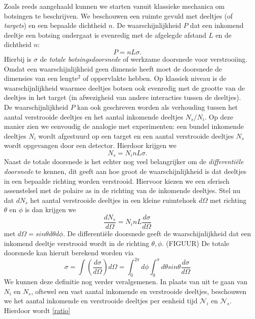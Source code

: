 \documentclass[11pt]{article}
\numberwithin{equation}{section}
\begin{document}
Zoals reeds aangehaald kunnen we starten vanuit klassieke mechanica om botsingen te beschrijven. We beschouwen een ruimte gevuld met deeltjes (of \emph{targets}) en een bepaalde dichtheid $n$. De waarschijnlijkheid $P$ dat een inkomend deeltje een botsing ondergaat is evenredig met de afgelegde afstand $L$ en de dichtheid $n$:
\begin{equation}
	P = nL\sigma.
\end{equation}
Hierbij is $\sigma$ de \emph{totale botsingsdoorsnede} of werkzame doorsnede voor verstrooiing. Omdat een waarschijnlijkheid geen dimensie heeft moet de doorsnede de dimensies van een lengte$^2$ of oppervlakte hebben. Op klassiek niveau is de waarschijnlijkheid waarmee deeltjes botsen ook evenredig met de grootte van de deeltjes in het target (in afwezigheid van andere interacties tussen de deeltjes). De waarschijnlijkheid $P$ kan ook geschreven worden als verhouding tussen het aantal verstrooide deeltjes en het aantal inkomende deeltjes $N_s / N_i$. Op deze manier zien we eenvoudig de analogie met experimenten: een bundel inkomende deeltjes $N_i$ wordt afgestuurd op een target en een aantal verstrooide deeltjes $N_s$ wordt opgevangen door een detector. Hierdoor krijgen we
\begin{equation}\label{ratio}
	N_s = N_inL\sigma.
\end{equation}
Naast de totale doorsnede is het echter nog veel belangrijker om de \emph{differenti\"ele doorsnede} te kennen, dit geeft aan hoe groot de waarschijnlijkheid is dat deeltjes in een bepaalde richting worden verstrooid. Hiervoor kiezen we een sferisch assenstelsel met de polaire as in de richting van de inkomende deeltjes. Stel nu dat $dN_s$ het aantal verstrooide deeltjes in een kleine ruimtehoek $d\Omega$ met richting $\theta$ en $\phi$ is dan krijgen we 
\begin{equation}
	\frac{dN_s}{d\Omega} = N_i nL\frac{d\sigma}{d\Omega}
\end{equation}
met $d\Omega = sin\theta d\theta d\phi$. De differenti\"ele doorsnede geeft de waarschijnlijkheid dat een inkomend deeltje verstrooid wordt in de richting $ \theta , \phi$. (FIGUUR) De totale doorsnede kan hieruit berekend worden via
\begin{equation}
	\sigma = \int \left(\frac{d\sigma}{d\Omega} \right) d\Omega = \int_{0}^{2\pi} d\phi \int_{0}^{\pi} d\theta sin\theta \frac{d\sigma}{d\Omega} 
\end{equation} 
We kunnen deze definitie nog verder veralgemenen. In plaats van uit te gaan van $N_i$ en $N_s$, oftewel een vast aantal inkomende en verstrooide deeltjes, beschouwen we het aantal inkomende en verstrooide deeltjes per eenheid tijd $\mathcal{N}_i$ en $\mathcal{N}_s$. Hierdoor wordt \eqref{ratio} 
\end{document}
